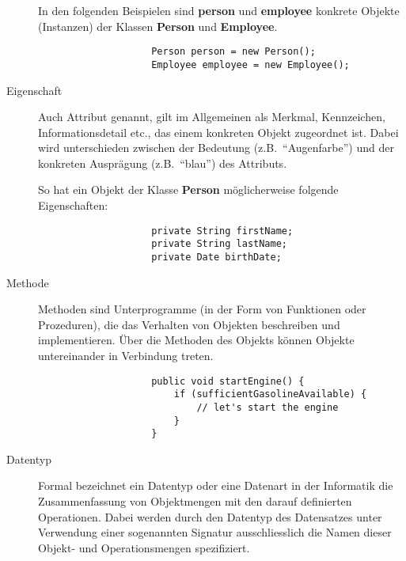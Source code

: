 \documentclass[12pt,a4paper]{exam}
\begin{document}
\begin{questions}
\begin{solution}
\begin{description}
                In den folgenden Beispielen sind \textbf{person} und \textbf{employee}
                konkrete Objekte (Instanzen) der Klassen \textbf{Person}
                und \textbf{Employee}.
                \begin{verbatim}
                    Person person = new Person();
                    Employee employee = new Employee();
                \end{verbatim}

                \item[Eigenschaft] Auch Attribut genannt, gilt im Allgemeinen als
                Merkmal, Kennzeichen, Informationsdetail etc., das einem
                konkreten Objekt zugeordnet ist. Dabei wird unterschieden
                zwischen der Bedeutung (z.B.~``Augenfarbe'') und der konkreten
                Ausprägung (z.B.~``blau'') des Attributs.

                So hat ein Objekt der Klasse \textbf{Person} möglicherweise
                folgende Eigenschaften:

                \begin{verbatim}
                    private String firstName;
                    private String lastName;
                    private Date birthDate;
                \end{verbatim}

                \item[Methode] Methoden sind Unterprogramme (in der Form von Funktionen
                oder Prozeduren), die das Verhalten von Objekten beschreiben und
                implementieren. Über die Methoden des Objekts können Objekte
                untereinander in Verbindung treten.

                \begin{verbatim}
                    public void startEngine() {
                        if (sufficientGasolineAvailable) {
                            // let's start the engine
                        }
                    }
                \end{verbatim}

                \item[Datentyp] Formal bezeichnet ein Datentyp oder eine Datenart
                in der Informatik die Zusammenfassung von Objektmengen mit
                den darauf definierten Operationen. Dabei werden durch den
                Datentyp des Datensatzes unter Verwendung einer sogenannten
                Signatur ausschliesslich die Namen dieser Objekt- und
                Operationsmengen spezifiziert.


\end{description}
\end{solution}
\end{questions}
\end{document}
